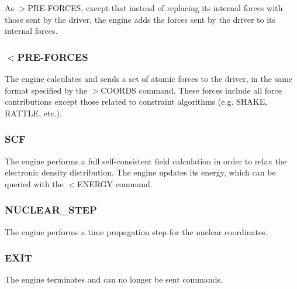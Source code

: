 As {\ttfamily $>$P\-R\-E-\/\-F\-O\-R\-C\-E\-S}, except that instead of replacing its internal forces with those sent by the driver, the engine adds the forces sent by the driver to its internal forces.\hypertarget{index_recv_preforces}{}\subsubsection{$<$\-P\-R\-E-\/\-F\-O\-R\-C\-E\-S}\label{index_recv_preforces}
The engine calculates and sends a set of atomic forces to the driver, in the same format specified by the {\ttfamily $>$C\-O\-O\-R\-D\-S} command. These forces include all force contributions except those related to constraint algorithms (e.\-g. S\-H\-A\-K\-E, R\-A\-T\-T\-L\-E, etc.).\hypertarget{index_scf_command}{}\subsubsection{S\-C\-F}\label{index_scf_command}
The engine performs a full self-\/consistent field calculation in order to relax the electronic density distribution. The engine updates its energy, which can be queried with the {\ttfamily $<$E\-N\-E\-R\-G\-Y} command.\hypertarget{index_nuclear_step}{}\subsubsection{N\-U\-C\-L\-E\-A\-R\-\_\-\-S\-T\-E\-P}\label{index_nuclear_step}
The engine performs a time propagation step for the nuclear coordinates.\hypertarget{index_exit_command}{}\subsubsection{E\-X\-I\-T}\label{index_exit_command}
The engine terminates and can no longer be sent commands. 